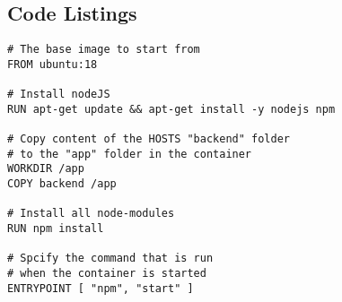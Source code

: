 
\subsection{Code Listings}
\begin{lstlisting}[language=docker, frame=single, caption={Exemplary NodeJS Dockerfile},label=code::docker]
# The base image to start from
FROM ubuntu:18

# Install nodeJS
RUN apt-get update && apt-get install -y nodejs npm

# Copy content of the HOSTS "backend" folder
# to the "app" folder in the container
WORKDIR /app
COPY backend /app

# Install all node-modules
RUN npm install

# Spcify the command that is run
# when the container is started
ENTRYPOINT [ "npm", "start" ]

\end{lstlisting}


